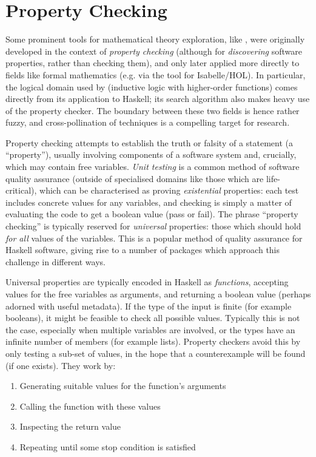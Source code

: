 \section{Property Checking}

Some prominent tools for mathematical theory exploration, like \quickspec{},
were originally developed in the context of \emph{property checking} (although
for \emph{discovering} software properties, rather than checking them), and only
later applied more directly to fields like formal mathematics (e.g. via the
\hipster{} tool for Isabelle/HOL). In particular, the logical domain used by
\quickspec{} (inductive logic with higher-order functions) comes directly from
its application to Haskell; its search algorithm also makes heavy use of the
\quickcheck{} property checker. The boundary between these two fields is hence
rather fuzzy, and cross-pollination of techniques is a compelling target for
research.

Property checking attempts to establish the truth or falsity of a statement (a
``property''), usually involving components of a software system and, crucially,
which may contain free variables. \emph{Unit testing} is a common method of
software quality assurance (outside of specialised domains like those which are
life-critical), which can be characterised as proving \emph{existential}
properties: each test includes concrete values for any variables, and checking
is simply a matter of evaluating the code to get a boolean value (pass or fail).
The phrase ``property checking'' is typically reserved for \emph{universal}
properties: those which should hold \emph{for all} values of the variables.
This is a popular method of quality assurance for Haskell software, giving rise
to a number of packages which approach this challenge in different ways.

Universal properties are typically encoded in Haskell as \emph{functions},
accepting values for the free variables as arguments, and returning a boolean
value (perhaps adorned with useful metadata). If the type of the input is finite
(for example booleans), it might be feasible to check all possible
values. Typically this is not the case, especially when multiple variables are
involved, or the types have an infinite number of members (for example
lists). Property checkers avoid this by only testing a sub-set of values, in the
hope that a counterexample will be found (if one exists). They work by:

\begin{enumerate}
\item Generating suitable values for the function's arguments
\item Calling the function with these values
\item Inspecting the return value
\item Repeating until some stop condition is satisfied
\end{enumerate}

